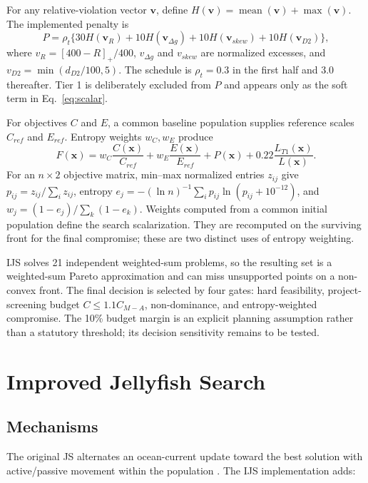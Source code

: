 \documentclass[preprint,12pt]{elsarticle}
\begin{document}
For any relative-violation vector $\bm v$, define $H(\bm v)=\operatorname{mean}(\bm v)+\max(\bm v)$. The implemented penalty is
\begin{equation}
P=\rho_t\{30H(\bm v_R)+10H(\bm v_{\Delta g})
+10H(\bm v_{skew})+10H(\bm v_{D2})\},
\label{eq:penalty}
\end{equation}
where $v_R=[400-R]_+/400$, $v_{\Delta g}$ and $v_{skew}$ are normalized excesses, and $v_{D2}=\min(d_{D2}/100,5)$. The schedule is $\rho_t=0.3$ in the first half and 3.0 thereafter. Tier 1 is deliberately excluded from $P$ and appears only as the soft term in Eq.~\eqref{eq:scalar}.

For objectives $C$ and $E$, a common baseline population supplies reference scales $C_{ref}$ and $E_{ref}$. Entropy weights $w_C,w_E$ produce
\begin{equation}
F(\bm x)=w_C\frac{C(\bm x)}{C_{ref}}+w_E\frac{E(\bm x)}{E_{ref}}
+P(\bm x)+0.22\frac{L_{T1}(\bm x)}{L(\bm x)}.
\label{eq:scalar}
\end{equation}
For an $n\times2$ objective matrix, min--max normalized entries $z_{ij}$ give $p_{ij}=z_{ij}/\sum_i z_{ij}$, entropy $e_j=-(\ln n)^{-1}\sum_i p_{ij}\ln(p_{ij}+10^{-12})$, and $w_j=(1-e_j)/\sum_k(1-e_k)$. Weights computed from a common initial population define the search scalarization. They are recomputed on the surviving front for the final compromise; these are two distinct uses of entropy weighting.

IJS solves 21 independent weighted-sum problems, so the resulting set is a weighted-sum Pareto approximation and can miss unsupported points on a non-convex front. The final decision is selected by four gates: hard feasibility, project-screening budget $C\leq1.1C_{M-A}$, non-dominance, and entropy-weighted compromise. The 10\% budget margin is an explicit planning assumption rather than a statutory threshold; its decision sensitivity remains to be tested.

\section{Improved Jellyfish Search}\label{sec:solver}

\subsection{Mechanisms}

The original JS alternates an ocean-current update toward the best solution with active/passive movement within the population \cite{chou2021}. The IJS implementation adds:
\end{document}
